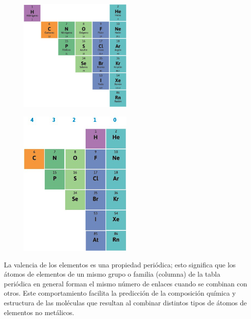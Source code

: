 \documentclass[11pt]{book}
\begin{document}
\begin{minipage}{.4\textwidth}
  \begin{figure}[H]
    \centering
    \includegraphics[width=0.5\textwidth]{no_metales.jpg}
    \label{fig:no_metales}
  \end{figure}
\end{minipage}\hfill
\begin{minipage}{.4\textwidth}
  \begin{figure}[H]
    \centering
    \includegraphics[width=0.5\textwidth]{valencia.jpg}
    \label{fig:valencia}
  \end{figure}
\end{minipage}

La valencia de los elementos es una propiedad periódica; esto significa que los átomos de elementos de un mismo grupo o familia (columna) de la tabla periódica en general forman el mismo número de enlaces cuando se combinan con otros. Este comportamiento facilita la predicción de la composición química y estructura de las moléculas que resultan al combinar distintos tipos de átomos de elementos no metálicos.
\end{document}
